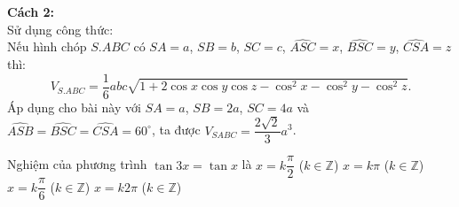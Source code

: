 \begin{ex}
{{
		}
	\textbf{Cách 2:}\\
		Sử dụng công thức:\\
		Nếu hình chóp $S.ABC$ có $SA=a$, $SB=b$, $SC=c$, $\widehat{ASC}=x$, $\widehat{BSC}=y$, $\widehat{CSA}=z$ thì:
		$$V_{S.ABC}= \dfrac{1}{6}abc \sqrt{1+2\cos x \cos y \cos z - \cos^2x - \cos^2y - \cos^2z}.$$
		Áp dụng cho bài này với $SA=a$, $SB=2a$, $SC=4a$ và $\widehat{ASB}=\widehat{BSC}=\widehat{CSA}=60^\circ$, ta được $V_{SABC} = \dfrac{2\sqrt{2}}{3}a^3$. 	
	}
\end{ex}

\begin{ex}%
	Nghiệm của phương trình $\tan3x=\tan x$ là
	\choice
	{$x=k\dfrac{\pi}{2}$ ($k\in\mathbb{Z}$)}
	{\True $x=k\pi$ ($k\in\mathbb{Z}$)}
	{$x=k\dfrac{\pi}{6}$ ($k\in\mathbb{Z}$)}
	{$x=k2\pi$ ($k\in\mathbb{Z}$)}
	
\end{ex}

